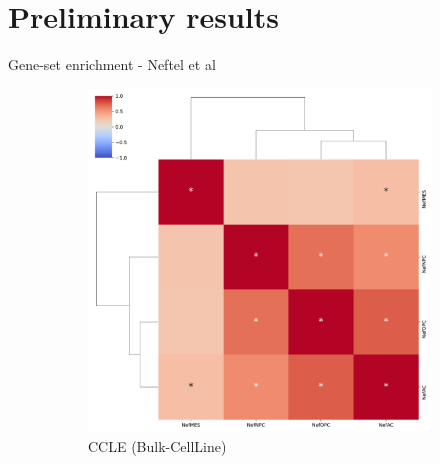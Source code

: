 \documentclass[aspectratio=169,9pt]{beamer}
\begin{document}
    \section{Preliminary results}
    \begin{frame}{Gene-set enrichment - Neftel et al}
        \begin{adjustwidth}{-5cm}{-5cm}
            \centering
            \begin{figure}
                \centering
                \begin{subfigure}[c]{0.48\textwidth}
                    \centering
                    \includegraphics[width=\textwidth]{ssGSEA_CCLE_corrplot_Nef}
                    \caption{CCLE (Bulk-CellLine)}
                \end{subfigure}
                \begin{subfigure}[c]{0.48\textwidth}
                    \centering

\end{subfigure}
\end{figure}
\end{adjustwidth}
\end{frame}
\end{document}
